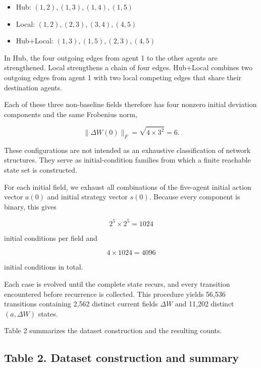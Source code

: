 \documentclass[
  11pt,
]{article}
\providecommand{\tightlist}{%
  \setlength{\itemsep}{0pt}\setlength{\parskip}{0pt}}
\begin{document}
\begin{itemize}
\tightlist
\item
  Hub: \({(1,2),(1,3),(1,4),(1,5)}\)
\item
  Local: \({(1,2),(2,3),(3,4),(4,5)}\)
\item
  Hub+Local: \({(1,3),(1,5),(2,3),(4,5)}\)
\end{itemize}

In Hub, the four outgoing edges from agent 1 to the other agents are
strengthened. Local strengthens a chain of four edges. Hub+Local
combines two outgoing edges from agent 1 with two local competing edges
that share their destination agents.

Each of these three non-baseline fields therefore has four nonzero
initial deviation components and the same Frobenius norm,

\[{\lVert\Delta W(0)\rVert_F=\sqrt{4\times3^2}=6.}\]

These configurations are not intended as an exhaustive classification of
network structures. They serve as initial-condition families from which
a finite reachable state set is constructed.

For each initial field, we exhaust all combinations of the five-agent
initial action vector \({a(0)}\) and initial strategy vector \({s(0)}\).
Because every component is binary, this gives

\[{2^5\times2^5=1024}\]

initial conditions per field and

\[{4\times1024=4096}\]

initial conditions in total.

Each case is evolved until the complete state recurs, and every
transition encountered before recurrence is collected. This procedure
yields 56,536 transitions containing 2,562 distinct current fields
\({\Delta W}\) and 11,202 distinct \({(a,\Delta W)}\) states.

Table 2 summarizes the dataset construction and the resulting counts.

\hypertarget{table-2.-dataset-construction-and-summary}{%
\subsection{Table 2. Dataset construction and
summary}\label{table-2.-dataset-construction-and-summary}}
\end{document}
